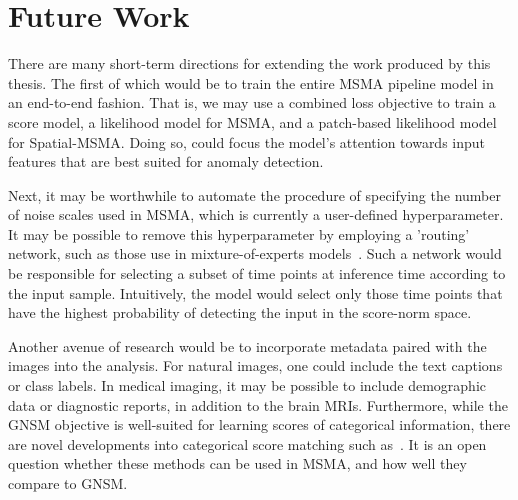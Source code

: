 

\section{Future Work}

There are many short-term directions for extending the work produced by this thesis. The first of which would be to train the entire MSMA pipeline model in an end-to-end fashion. That is, we may use a combined loss objective to train a score model, a likelihood model for MSMA, and a patch-based likelihood model for Spatial-MSMA. Doing so, could focus the model's attention towards input features that are best suited for anomaly detection.

Next, it may be worthwhile to automate the procedure of specifying the number of noise scales used in MSMA, which is currently a user-defined hyperparameter. It may be possible to remove this hyperparameter by employing a 'routing' network, such as those use in mixture-of-experts models~\cite{zoph2022stmoe}. Such a network would be responsible for selecting a subset of time points at inference time according to the input sample. Intuitively, the model would select only those time points that have the highest probability of detecting the input in the score-norm space.

Another avenue of research would be to incorporate metadata paired with the images into the analysis. For natural images, one could include the text captions or class labels. In medical imaging, it may be possible to include demographic data or diagnostic reports, in addition to the brain MRIs. Furthermore, while the GNSM objective is well-suited for learning scores of categorical information, there are novel developments into categorical score matching such as~\cite{graves2024bayesian,lou2024discrete}. It is an open question whether these methods can be used in MSMA, and how well they compare to GNSM.

